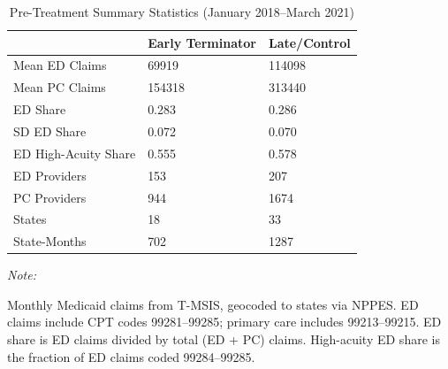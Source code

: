 \begin{table}[!h]
\centering
\caption{Pre-Treatment Summary Statistics (January 2018--March 2021)}
\centering
\begin{threeparttable}
\begin{tabular}[t]{lll}
\toprule
  & Early Terminator & Late/Control\\
\midrule
Mean ED Claims & 69919 & 114098\\
Mean PC Claims & 154318 & 313440\\
ED Share & 0.283 & 0.286\\
SD ED Share & 0.072 & 0.070\\
ED High-Acuity Share & 0.555 & 0.578\\
\addlinespace
ED Providers & 153 & 207\\
PC Providers & 944 & 1674\\
States & 18 & 33\\
State-Months & 702 & 1287\\
\bottomrule
\end{tabular}
\begin{tablenotes}
\item \textit{Note: } 
\item Monthly Medicaid claims from T-MSIS, geocoded to states via NPPES. ED claims include CPT codes 99281--99285; primary care includes 99213--99215. ED share is ED claims divided by total (ED + PC) claims. High-acuity ED share is the fraction of ED claims coded 99284--99285.
\end{tablenotes}
\end{threeparttable}
\end{table}
